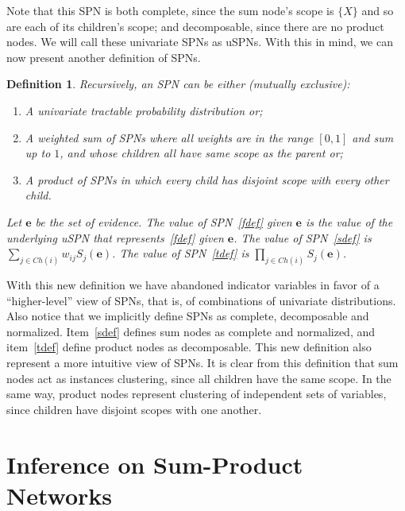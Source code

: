 \documentclass{amsart}
\theoremstyle{plain}
\newcounter{dummy-def}\numberwithin{dummy-def}{section}
\newtheorem{definition}[dummy-def]{Definition}
\newcounter{dummy-thm}\numberwithin{dummy-thm}{section}
\newcounter{dummy-prop}\numberwithin{dummy-prop}{section}
\newcounter{dummy-ex}\numberwithin{dummy-ex}{section}
\newcounter{dummy-eg}\numberwithin{dummy-eg}{section}
\numberwithin{equation}{section}
\begin{document}
Note that this SPN is both complete, since the sum node's scope is $\{X\}$ and so are each of its
children's scope; and decomposable, since there are no product nodes. We will call these univariate
SPNs as uSPNs. With this in mind, we can now present another definition of SPNs.

\begin{definition}
  Recursively, an SPN can be either (mutually exclusive):
  \begin{enumerate}[label=(\arabic*)]
    \item \label{fdef} A univariate tractable probability distribution or;
    \item \label{sdef} A weighted sum of SPNs where all weights are in the range $[0,1]$ and sum up
      to $1$, and whose children all have same scope as the parent or;\label{sdef}
    \item \label{tdef} A product of SPNs in which every child has disjoint scope with every other
      child.
  \end{enumerate}
  Let $\mathbf{e}$ be the set of evidence. The value of SPN~\ref{fdef} given $\mathbf{e}$ is the
  value of the underlying uSPN that represents~\ref{fdef} given $\mathbf{e}$. The value of
  SPN~\ref{sdef} is $\sum_{j\in Ch(i)}w_{ij}S_j(\mathbf{e})$. The value of SPN~\ref{tdef} is
  $\prod_{j\in Ch(i)}S_j(\mathbf{e})$.
\end{definition}

With this new definition we have abandoned indicator variables in favor of a ``higher-level'' view
of SPNs, that is, of combinations of univariate distributions. Also notice that we implicitly
define SPNs as complete, decomposable and normalized. Item~\ref{sdef} defines sum nodes as complete
and normalized, and item~\ref{tdef} define product nodes as decomposable. This new definition also
represent a more intuitive view of SPNs. It is clear from this definition that sum nodes act as
instances clustering, since all children have the same scope. In the same way, product nodes
represent clustering of independent sets of variables, since children have disjoint scopes with
one another.

\section{Inference on Sum-Product Networks}




\newpage
\appendix

\newpage

\printbibliography[]
\end{document}
